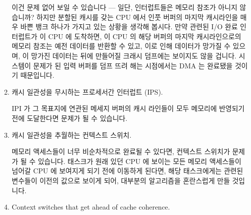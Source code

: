\begin{enumerate}
	이건 문제 없어 보일 수 있습니다 --- 일단, 인터럽트들은 메모리 참조가
	아니지 않습니까?
	하지만 분할된 캐시를 갖는 CPU 에서 인풋 버퍼의 마지막 캐시라인을 매우
	바쁜 뱅크 하나가 가지고 있는 상황을 생각해 봅시다.
	만약 관련된 I/O 완료 인터럽트가 이 CPU 에 도착하면, 이 CPU 의 해당
	버퍼의 마지막 캐시라인으로의 메모리 참조는 예전 데이터를 반환할 수
	있고, 이로 인해 데이터가 망가질 수 있으며, 이 망가진 데이터는 뒤에
	만들어질 크래시 덤프에는 보이지도 않을 겁니다.
	시스템이 문제가 된 입력 버퍼를 덤프 뜨려 해는 시점에서는 DMA 는
	완료됐을 것이기 때문입니다.

\item	캐시 일관성을 무시하는 프로세서간 인터럽트 (IPS).

	IPI 가 그 목표지에 연관된 메세지 버퍼의 캐시 라인들이 모두 메모리에
	반영되기 전에 도달한다면 문제가 될 수 있습니다.

\item	캐시 일관성을 추월하는 컨텍스트 스위치.

	메모리 액세스들이 너무 비순차적으로 완료될 수 있다면, 컨텍스트 스위치가
	문제가 될 수 있습니다.
	태스크가 원래 있던 CPU 에 보이는 모든 메모리 액세스들이 넘어갈 CPU 에
	보여지게 되기 전에 이동하게 된다면, 해당 태스크에게는 관련된 변수들이
	이전의 값으로 보이게 되어, 대부분의 알고리즘을 혼란스럽게 만들
	것입니다.
\iffalse

\item	Context switches that get ahead of cache coherence.


\end{enumerate}

